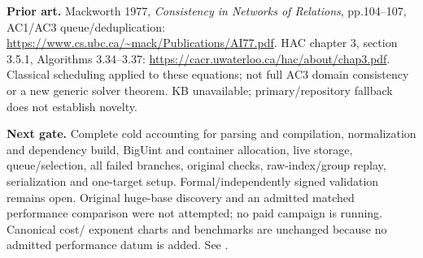 \documentclass[10pt]{article}
\begin{document}
\textbf{Prior art.} Mackworth 1977, \emph{Consistency in Networks of Relations},
pp.104--107, AC1/AC3 queue/deduplication:
\url{https://www.cs.ubc.ca/~mack/Publications/AI77.pdf}.
HAC chapter 3, section 3.5.1, Algorithms 3.34--3.37:
\url{https://cacr.uwaterloo.ca/hac/about/chap3.pdf}.
Classical scheduling applied to these equations; not full AC3 domain
consistency or a new generic solver theorem. KB unavailable; primary/repository
fallback does not establish novelty.

\textbf{Next gate.} Complete cold accounting for parsing and compilation,
normalization and dependency build, BigUint and container allocation, live storage,
queue/selection, all failed branches, original checks, raw-index/group replay,
serialization and one-target setup. Formal/independently signed validation
remains open. Original huge-base discovery and an admitted matched performance
comparison were not attempted; no paid campaign is running. Canonical cost/
exponent charts and benchmarks are unchanged because no admitted performance
datum is added. See .
\end{document}
